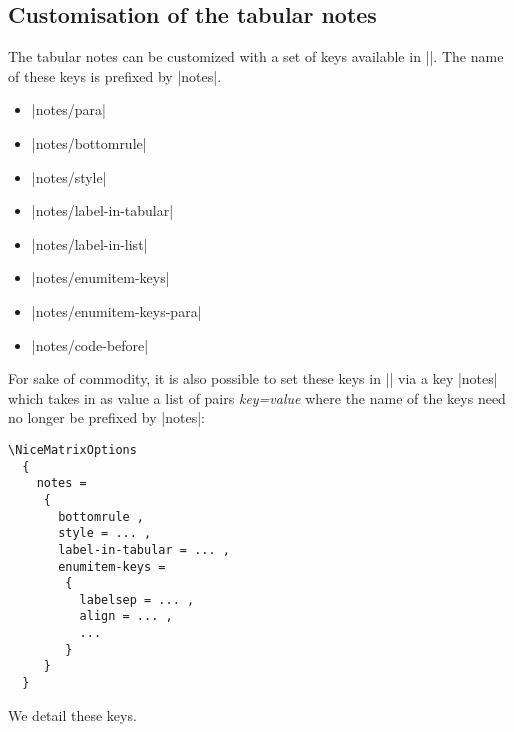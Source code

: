 \documentclass[dvipsnames]{article}%
\begin{document}
\subsection{Customisation of the tabular notes}



The tabular notes can be customized with a set of keys available in
|\NiceMatrixOptions|. The name of these keys is prefixed by |notes|.
\begin{itemize}
\item |notes/para| 
\item |notes/bottomrule| 
\item |notes/style| 
\item |notes/label-in-tabular| 
\item |notes/label-in-list| 
\item |notes/enumitem-keys| 
\item |notes/enumitem-keys-para| 
\item |notes/code-before|
\end{itemize}
For sake of commodity, it is also possible to set these keys in
|\NiceMatrixOptions| via a key |notes| which takes in as value a list of 
pairs \textsl{key=value} where the name of the keys need no longer be
prefixed by |notes|:
\begin{center}
\begin{BVerbatim}[formatcom = \small \color{gray}]
\NiceMatrixOptions
  {
    notes = 
     {
       bottomrule ,
       style = ... ,
       label-in-tabular = ... ,
       enumitem-keys = 
        {
          labelsep = ... ,
          align = ... ,
          ...
        }
     }
  }
\end{BVerbatim}
\end{center}


\bigskip
We detail these keys.
\end{document}
